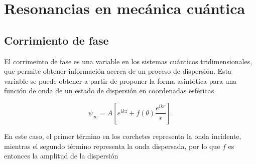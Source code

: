 \chapter{Resonancias en mecánica cuántica}

\section{Corrimiento de fase}

El corrimeinto de fase es una variable en los sistemas cuánticos tridimensionales, que permite obtener información acerca de un proceso de dispersión. Esta variable se puede obtener a partir de proponer la forma asintótica para una función de onda de un estado de dispersión en coordenadas esféricas

\begin{equation*}
	\psi_{\infty} = A \left[e^{i k z} + f(\theta)  \frac{e^{i k r}}{r} \right].
\end{equation*}

En este caso, el primer término en los corchetes representa la onda incidente, mientras el segundo término representa la onda dispersada, por lo que $f$ es entonces la amplitud de la dispersión

